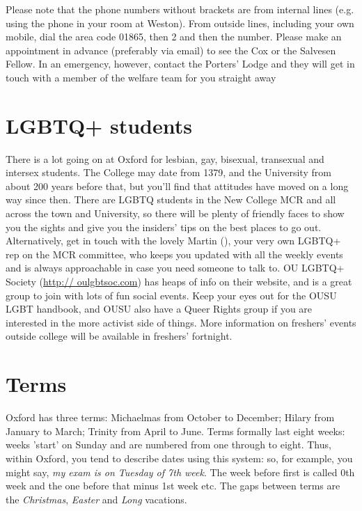 Please note that the phone numbers without brackets are from internal lines (e.g. using the phone in your room at Weston). From outside lines, including your own mobile, dial the area code 01865, then 2 and then the number. Please make an appointment in advance (preferably via email) to see the Cox or the Salvesen Fellow. In an emergency, however, contact the Porters' Lodge and they will get in touch with a member of the welfare team for you straight away

\section{LGBTQ+ students}
There is a lot going on at Oxford for lesbian, gay, bisexual, transexual and
intersex students. The College may date from 1379, and the University from about
200 years before that, but you'll find that attitudes have moved on a long way
since then. There are LGBTQ students in the New College MCR and all across the
town and University, so there will be plenty of friendly faces to show you the
sights and give you the insiders' tips on the best places to go out.
Alternatively, get in touch with the lovely Martin
(\href{mailto:martin.hallmannsecker@new.ox.ac.uk}{}), your very own LGBTQ+ rep on the MCR committee, who keeps you updated with all the weekly events and is always approachable in case you need someone to talk to. OU LGBTQ+ Society (\url{http:// oulgbtsoc.com}) has heaps of info on their website, and is a great group to join with lots of fun social events. Keep your eyes out for the OUSU LGBT handbook, and OUSU also have a Queer Rights group if you are interested in the more activist side of things. More information on freshers' events outside college will be available in freshers' fortnight.

\section{Terms}
Oxford has three terms: Michaelmas from October to December; Hilary from January
to March; Trinity from April to June. Terms formally last eight weeks: weeks
'start' on Sunday and are numbered from one through to eight. Thus, within
Oxford, you tend to describe dates using this system: so, for example, you might
say, \emph{my exam is on Tuesday of 7th week}. The week before first is called
0th week and the one before that minus 1st week etc. The gaps between terms are the \emph{Christmas}, \emph{Easter} and \emph{Long} vacations.
\medskip

